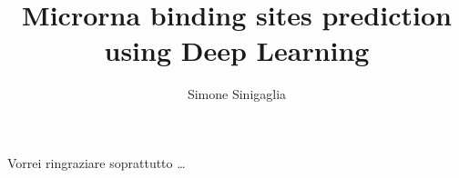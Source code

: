 \documentclass[
12pt, %
english, %
]{report} %
\begin{document}
	\title{Microrna binding sites prediction \\
		using Deep Learning}
	\author{Simone Sinigaglia}
	
	\beforepreface
	Vorrei ringraziare soprattutto \dots
	\afterpreface
	
	
	
%
%



%
%
	
\appendix %


%



\end{document}
